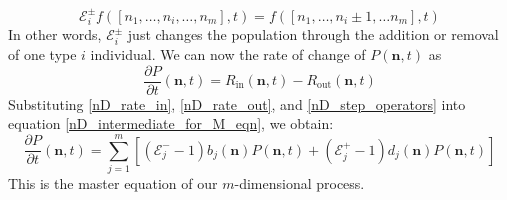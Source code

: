 \begin{equation}
\label{nD_step_operators}
\mathcal{E}_{i}^{\pm}f([n_1,\ldots,n_i,\ldots,n_m],t) = f([n_1,\ldots,n_i \pm 1, \ldots n_m],t)
\end{equation}
In other words, $\mathcal{E}_{i}^{\pm}$ just changes the population through the addition or removal of one type $i$ individual. We can now the rate of change of $P(\mathbf{n},t)$ as
\begin{equation}
\label{nD_intermediate_for_M_eqn}
\frac{\partial P}{\partial t}(\mathbf{n},t) = R_{\textrm{in}}(\mathbf{n},t) - R_{\textrm{out}}(\mathbf{n},t)
\end{equation}
Substituting \eqref{nD_rate_in}, \eqref{nD_rate_out}, and \eqref{nD_step_operators} into equation \eqref{nD_intermediate_for_M_eqn}, we obtain:
\begin{equation}
\label{nD_M_eqn}
\frac{\partial P}{\partial t}(\mathbf{n},t) = \sum\limits_{j=1}^{m}\left[(\mathcal{E}_j^{-}-1)b_j(\mathbf{n})P(\mathbf{n},t) + (\mathcal{E}_j^{+}-1)d_j(\mathbf{n})P(\mathbf{n},t)\right]
\end{equation}
This is the master equation of our $m$-dimensional process.


